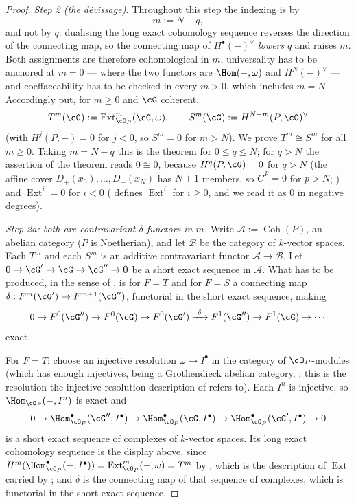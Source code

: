 \begin{proof}
\emph{Step 2 (the dévissage).}  Throughout this step the indexing is
by
\[
m:=N-q ,
\]
and not by $q$: dualising the long exact cohomology sequence reverses
the direction of the connecting map, so the connecting map of
$H^{\bullet}(-)^{\vee}$ \emph{lowers} $q$ and raises $m$.  Both
assignments are therefore cohomological in $m$, universality has to
be anchored at $m=0$ --- where the two functors are
$\Hom(-,\omega)$ and $H^N(-)^{\vee}$ --- and coeffaceability has to
be checked in every $m>0$, which includes $m=N$.  Accordingly put,
for $m\ge0$ and $\cG$ coherent,
\[
T^m(\cG):=\operatorname{Ext}^m_{\cO_P}(\cG,\omega),
\qquad
S^m(\cG):=H^{N-m}(P,\cG)^{\vee}
\]
(with $H^{j}(P,-)=0$ for $j<0$, so $S^m=0$ for $m>N$).  We prove
$T^m\cong S^m$ for all $m\ge0$.  Taking $m=N-q$ this is the theorem
for $0\le q\le N$; for $q>N$ the assertion of the theorem reads
$0\cong0$, because $H^q(P,\cG)=0$ for $q>N$ (the affine cover
$D_+(x_0),\dots,D_+(x_N)$ has $N+1$ members, so $\check C^{\,p}=0$
for $p>N$; ) and
$\operatorname{Ext}^{i}=0$ for $i<0$ ( defines
$\operatorname{Ext}^{i}$ for $i\ge0$, and we read it as $0$ in
negative degrees).

\emph{Step 2a: both are contravariant $\delta$-functors in $m$.}
Write $\mathcal A:=\operatorname{Coh}(P)$, an abelian category ($P$ is
Noetherian), and let $\mathcal B$ be the category of $k$-vector
spaces.  Each $T^m$ and each $S^m$ is an additive contravariant
functor $\mathcal A\to\mathcal B$.  Let
$0\to\cG'\to\cG\to\cG''\to0$ be a short exact sequence in
$\mathcal A$.  What has to be produced, in the sense of
, is for $F=T$ and for $F=S$ a
connecting map $\delta:F^m(\cG')\to F^{m+1}(\cG'')$, functorial in
the short exact sequence, making
\[
0\to F^0(\cG'')\to F^0(\cG)\to F^0(\cG')
\xrightarrow{\ \delta\ }F^1(\cG'')\to F^1(\cG)\to\cdots
\]
exact.

For $F=T$: choose an injective resolution $\omega\to I^{\bullet}$ in
the category of $\cO_P$-modules (which has enough injectives, being a
Grothendieck abelian category,
; this is
the resolution the injective-resolution description of
 refers to).  Each $I^n$ is injective, so
$\Hom_{\cO_P}(-,I^n)$ is exact and
\[
0\to\Hom^{\bullet}_{\cO_P}(\cG'',I^{\bullet})
\to\Hom^{\bullet}_{\cO_P}(\cG,I^{\bullet})
\to\Hom^{\bullet}_{\cO_P}(\cG',I^{\bullet})\to0
\]
is a short exact sequence of complexes of $k$-vector spaces.  Its
long exact cohomology sequence is the display above, since
$H^{m}(\Hom^{\bullet}_{\cO_P}(-,I^{\bullet}))
=\operatorname{Ext}^{m}_{\cO_P}(-,\omega)=T^m$ by
, which is the description of
$\operatorname{Ext}$ carried by ; and $\delta$ is
the connecting map of that sequence of complexes, which is
functorial in the short exact sequence.


\end{proof}

